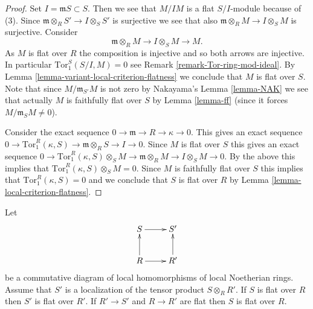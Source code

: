 \begin{proof}
Set $I = \mathfrak mS \subset S$. Then we see that $M/IM$ is a flat
$S/I$-module because of (3). Since
$\mathfrak m \otimes_R S' \to I \otimes_S S'$ is surjective we see
that also $\mathfrak m \otimes_R M \to I \otimes_S M$ is surjective.
Consider
$$
\mathfrak m \otimes_R M \to I \otimes_S M \to M.
$$
As $M$ is flat over $R$ the composition is injective
and so both arrows are injective.
In particular $\text{Tor}_1^S(S/I, M) = 0$ see
Remark \ref{remark-Tor-ring-mod-ideal}. By
Lemma \ref{lemma-variant-local-criterion-flatness} we conclude
that $M$ is flat over $S$. Note that since $M/\mathfrak m_{S'}M$
is not zero by Nakayama's Lemma \ref{lemma-NAK}
we see that actually $M$ is faithfully flat over $S$ by
Lemma \ref{lemma-ff} (since it forces $M/\mathfrak m_{S}M \not = 0$).

\medskip\noindent
Consider the exact sequence
$0 \to \mathfrak m \to R \to \kappa \to 0$.
This gives an exact sequence
$0 \to \text{Tor}_1^R(\kappa, S) \to \mathfrak m \otimes_R S \to I \to 0$.
Since $M$ is flat over $S$ this gives an exact sequence
$0 \to \text{Tor}_1^R(\kappa, S)\otimes_S M \to
\mathfrak m \otimes_R M \to I \otimes_S M \to 0$.
By the above this implies that $\text{Tor}_1^R(\kappa, S)\otimes_S M = 0$.
Since $M$ is faithfully flat over $S$ this implies that
$\text{Tor}_1^R(\kappa, S) = 0$ and we conclude that
$S$ is flat over $R$ by Lemma \ref{lemma-local-criterion-flatness}.
\end{proof}



\begin{lemma}
\label{lemma-base-change-flat-up-down}
Let
$$
\xymatrix{
S \ar[r] & S' \\
R \ar[r] \ar[u] & R' \ar[u]
}
$$
be a commutative diagram of local homomorphisms of local Noetherian rings.
Assume that $S'$ is a localization of the tensor product
$S \otimes_R R'$. If $S$ is flat over $R$ then $S'$ is flat over $R'$.
If $R' \to S'$ and $R \to R'$ are flat then $S$ is flat over $R$.
\end{lemma}

